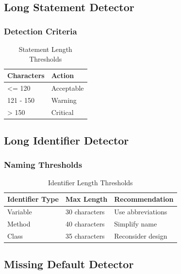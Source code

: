 \documentclass[12pt,a4paper]{article}
\begin{document}
    \subsection{Long Statement Detector}

    \subsubsection{Detection Criteria}

    \begin{table}[H]
        \caption{Statement Length Thresholds}
        \begin{tabular}{|l|l|}
            \hline
            \textbf{Characters} & \textbf{Action} \\
            \hline
            <= 120 & Acceptable \\
            \hline
            121 - 150 & Warning \\
            \hline
            > 150 & Critical \\
            \hline
        \end{tabular}
    \end{table}

    \subsection{Long Identifier Detector}

    \subsubsection{Naming Thresholds}

    \begin{table}[H]
        \caption{Identifier Length Thresholds}
        \begin{tabular}{|l|l|l|}
            \hline
            \textbf{Identifier Type} & \textbf{Max Length} & \textbf{Recommendation} \\
            \hline
            Variable & 30 characters & Use abbreviations \\
            \hline
            Method & 40 characters & Simplify name \\
            \hline
            Class & 35 characters & Reconsider design \\
            \hline
        \end{tabular}
    \end{table}

    \subsection{Missing Default Detector}
\end{document}
